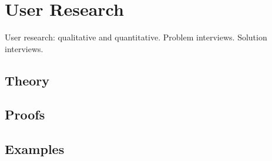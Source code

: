 
\section{User Research}
\label{sec:2.6.13-user-research}

\begin{ticket}
User research: qualitative and quantitative. Problem interviews. Solution interviews.
\end{ticket}

\subsection*{Theory}

\subsection*{Proofs}

\subsection*{Examples}
